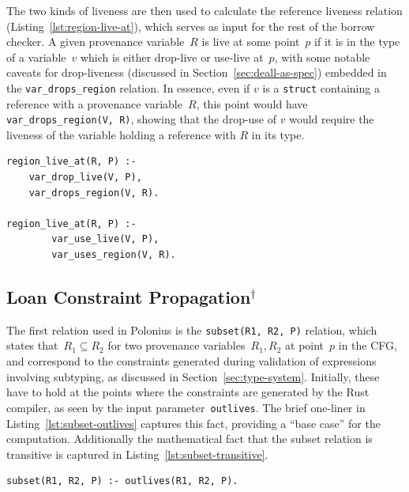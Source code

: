 \documentclass[11pt,a4paper,twoside,openany,draft]{report}
\newcommand{\notmine}[0] {$^\dagger$}
\newenvironment{sourcecode}{\captionsetup{type=listing}}{}
\newcommand{\InRust}[1]{\texttt{#1}}
\newcommand{\InDatalog}[1]{\texttt{#1}}
\begin{document}
The two kinds of liveness are then used to calculate the reference liveness
relation (Listing~\ref{lst:region-live-at}), which serves as input for the rest
of the borrow checker. A given provenance variable~$R$ is live at some point~$p$
if it is in the type of a variable~$v$ which is either drop-live or use-live
at~$p$, with some notable caveats for drop-liveness (discussed in
Section~\ref{sec:deall-as-spec}) embedded in the \InDatalog{var_drops_region}
relation. In essence, even if $v$ is a \InRust{struct} containing a reference
with a provenance variable~$R$, this point would have
\InDatalog{var_drops_region(V, R)}, showing that the drop-use of $v$ would
require the liveness of the variable holding a reference with $R$ in its type.

\begin{sourcecode}
  \label{lst:region-live-at}
\begin{verbatim}
region_live_at(R, P) :-
    var_drop_live(V, P),
    var_drops_region(V, R).
        
region_live_at(R, P) :-
        var_use_live(V, P),
        var_uses_region(V, R).
\end{verbatim}
\end{sourcecode}

\subsection{Loan Constraint Propagation\notmine{}}\label{sec:loan-constr-prop}

The first relation used in Polonius is the \InDatalog{subset(R1, R2, P)}
relation, which states that~$R_1 \subseteq R_2$ for two provenance
variables~$R_1, R_2$ at point~$p$ in the CFG, and correspond to the constraints
generated during validation of expressions involving subtyping, as discussed in
Section~\ref{sec:type-system}. Initially, these have to hold at the points where
the constraints are generated by the Rust compiler, as seen by the input
parameter~\InDatalog{outlives}. The brief one-liner in
Listing~\ref{lst:subset-outlives} captures this fact, providing a ``base case''
for the computation. Additionally the mathematical fact that the subset relation
is transitive is captured in Listing~\ref{lst:subset-transitive}.

\begin{sourcecode}
  \label{lst:subset-outlives}
\begin{verbatim}
subset(R1, R2, P) :- outlives(R1, R2, P).
\end{verbatim}
\end{sourcecode}
\end{document}
